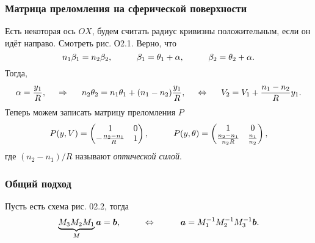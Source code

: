 \subsubsection*{Матрица преломления на сферической поверхности}

Есть некоторая ось $OX$, будем считать радиус кривизны положительным, если он идёт направо. Смотреть рис. О2.1. Верно, что
\begin{equation*}
    n_1 \beta_1 = n_2 \beta_2,
    \hspace{1 cm}
    \beta_1 = \theta_1 + \alpha, 
    \hspace{1 cm}
    \beta_2 = \theta_2 + \alpha.
\end{equation*}
Тогда,
\begin{equation*}
    \alpha = \frac{y_1}{R}, 
    \hspace{0.5cm} \Rightarrow \hspace{0.5cm}   
    n_2 \theta_2 = n_1 \theta_1 + (n_1 - n_2) \frac{y_1}{R},
    \hspace{0.5cm} \Leftrightarrow \hspace{0.5cm}
    V_2 = V_1 + \frac{n_1-n_2}{R} y_1.
\end{equation*}
Теперь можем записать матрицу преломления $P$
\begin{equation}
    P(y, V) = \begin{pmatrix}
        1 & 0 \\
        -\frac{n_2-n_1}{R} & 1 \\
    \end{pmatrix},
    \hspace{1 cm}
    P(y, \theta) = 
    \begin{pmatrix}
        1 & 0 \\
        \frac{n_2-n_1}{n_2 R} & \frac{n_1}{n_2} \\
    \end{pmatrix},
\end{equation}
где $(n_2-n_1)/R$ называют \textit{оптической силой}.


\subsubsection*{Общий подход}

Пусть есть  схема рис. 02.2, тогда
\begin{equation*}
    \underbrace{M_3 M_2 M_1}_{M} \mbox{\boldmath $a$} = \mbox{\boldmath $b$},
    \hspace{1 cm}
    \Leftrightarrow
    \hspace{1 cm}
    \mbox{\boldmath $a$} = M_1^{-1} M_2^{-1} M_3^{-1} \mbox{\boldmath $b$}.
\end{equation*}

